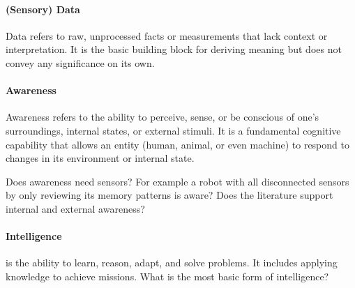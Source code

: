 \documentclass{book}
\begin{document}
\paragraph{(Sensory) Data} Data refers to raw, unprocessed facts or measurements that lack context or interpretation. It is the basic building block for deriving meaning but does not convey any significance on its own.

\paragraph{Awareness}
Awareness refers to the ability to perceive, sense, or be conscious of one’s surroundings, internal states, or external stimuli. It is a fundamental cognitive capability that allows an entity (human, animal, or even machine) to respond to changes in its environment or internal state.

Does awareness need sensors? For example a robot with all disconnected sensors by only reviewing its memory patterns is aware? Does the literature support internal and external awareness?




\paragraph{Intelligence}  is the ability to learn, reason, adapt, and solve problems. It includes applying knowledge to achieve missions. What is the most basic form of intelligence?
\end{document}
